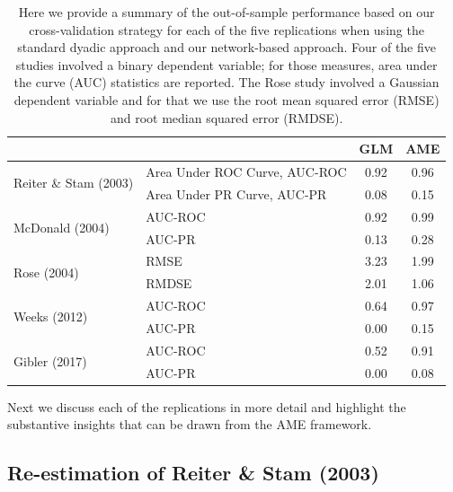 \begin{table}[ht]
\centering
	\begin{tabular}{l|l cc}
	~ & ~ & GLM & AME \\
	\toprule
		\multirow{2}{*}{Reiter \& Stam (2003)} & Area Under ROC Curve, AUC-ROC & 0.92 & {0.96} \\
				~ & Area Under PR Curve, AUC-PR & 0.08 &  {0.15} \\		\midrule
		\multirow{2}{*}{McDonald (2004)} & AUC-ROC & 0.92 &  {0.99} \\
				~ & AUC-PR & 0.13 &  {0.28} \\		\midrule
		\multirow{2}{*}{Rose (2004)} & RMSE & 3.23 &  {1.99} \\
				~ & RMDSE & 2.01 &  {1.06} \\	\midrule
		\multirow{2}{*}{Weeks (2012)} & AUC-ROC & 0.64 &  {0.97} \\
				~ & AUC-PR & 0.00 &  {0.15} \\		\midrule
		\multirow{2}{*}{Gibler (2017)} & AUC-ROC & 0.52 &  {0.91} \\
				~ & AUC-PR & 0.00 &  {0.08} \\			\bottomrule
	\end{tabular}
	\caption{Here we provide a summary of the out-of-sample performance based on our cross-validation strategy for each of the five replications when using the standard dyadic approach and our network-based approach. Four of the five studies involved a binary dependent variable; for those measures, area under the curve (AUC) statistics are reported. The Rose study involved a Gaussian dependent variable and for that we use the root mean squared error (RMSE) and root median squared error (RMDSE). 
	}
	\label{tab:modelPerfSumm}
\end{table}
\FloatBarrier

Next we discuss each of the replications in more detail and highlight the substantive insights that can be drawn from the AME framework.

\subsection{Re-estimation of Reiter \& Stam (2003)}

